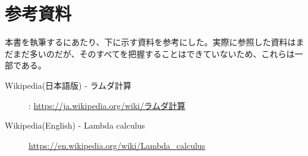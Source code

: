 {	\section{参考資料}{
		本書を執筆するにあたり、下に示す資料を参考にした。実際に参照した資料はまだまだ多いのだが、そのすべてを把握することはできていないため、これらは一部である。
		
		\begin{description}
			\item[Wikipedia(日本語版) - ラムダ計算] : \url{https://ja.wikipedia.org/wiki/ラムダ計算}
			\item[Wikipedia(English) - Lambda calculus] \url{https://en.wikipedia.org/wiki/Lambda_calculus}
		\end{description}

	}
}